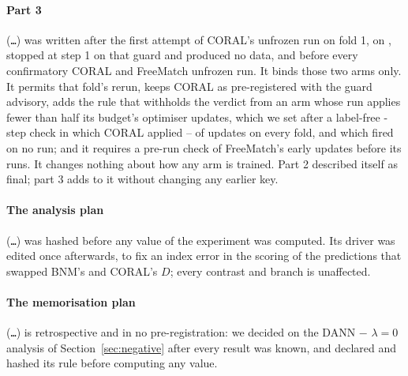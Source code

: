 \paragraph{Part 3} (\texttt{\dlShaPartThree\ldots}) was written after the first attempt of
CORAL's unfrozen run on fold 1, on \dlAbortDate{}, stopped at step 1 on that guard and produced
no data, and before every confirmatory CORAL and FreeMatch unfrozen run. It binds those two arms
only. It permits that fold's rerun, keeps CORAL as pre-registered with the guard advisory, adds
the rule that withholds the verdict from an arm whose run applies fewer than half its budget's
optimiser updates, which we set after a label-free \dlCoralCheckSteps{}-step check in which CORAL
applied \dlCoralCheckAppliedMin{}--\dlCoralCheckAppliedMax{} of \dlCoralCheckSteps{} updates on
every fold, and which fired on no run; and it requires a pre-run check of FreeMatch's early
updates before its runs. It changes nothing about how any arm is trained. Part 2 described
itself as final; part 3 adds to it without changing any earlier key.

\paragraph{The analysis plan} (\texttt{\dlShaPlan\ldots}) was hashed before any value of the
experiment was computed. Its driver was edited once afterwards, to fix an index error in the
scoring of the predictions that swapped BNM's and CORAL's $D$; every contrast and branch is
unaffected.

\paragraph{The memorisation plan} (\texttt{\dlShaGapPlan\ldots}) is retrospective and in no
pre-registration: we decided on the DANN $-$ $\lambda=0$ analysis of
Section~\ref{sec:negative} after every result was known, and declared and hashed its rule before
computing any value.
